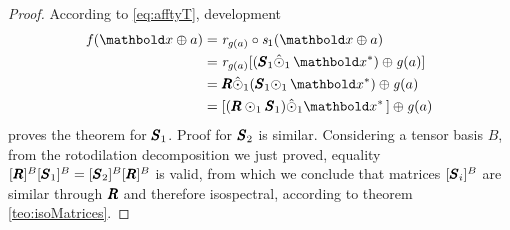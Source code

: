 {\footnotesize
\begin{proof}
According to \eqref{eq:afftyT}, development
\begin{align*}
\fua{\mathit{f}}{\vto{x}\oplus a}&=\mathit{r}_{\fua{\mathit{g}}{a}}\circ\mathit{s}_1(\vto{x}\oplus a)\\
&=\mathit{r}_{\fua{\mathit{g}}{a}}[(\tnr{S}_1\hat{\odot}_1\,\vto{x}^*)\oplus{\fua{\mathit{g}}{a}}]\\
&=\tnr{R}\hat{\odot}_1(\tnr{S}_1{\odot}_1\,\vto{x}^*)\oplus{\fua{\mathit{g}}{a}}\\
&=[(\tnr{R}\odot_1\tnr{S}_1){\hat{\odot}_1\vto{x}^*}\,]\oplus{\fua{\mathit{g}}{a}}
\end{align*}
proves the theorem for $\pmb{S}_1$. Proof for $\pmb{S}_2$ is similar. Considering a tensor basis $B$, from the rotodilation decomposition we just proved, equality $[\pmb{R}]^{B}[\pmb{S}_1]^{B}=[\pmb{S}_2]^{B}[\pmb{R}]^{B}$ is valid, from which we conclude that matrices $[\pmb{S}_i]^{B}$ are similar through $\pmb{R}$ and therefore isospectral, according to theorem \ref{teo:isoMatrices}. 
\end{proof}}


